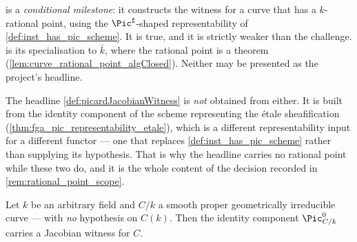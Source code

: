 \begin{remark}
  \label{rem:pointed_witness_scope}
   is a \emph{conditional
  milestone}: it constructs the witness for a curve that has a \(k\)-rational point,
  using the \(\Pic^\sharp\)-shaped representability of
  \cref{def:inst_has_pic_scheme}. It is true, and it is strictly weaker than the
  challenge.  is its specialisation to
  \(\bar k\), where the rational point is a theorem
  (\cref{lem:curve_rational_point_algClosed}). Neither may be presented as the
  project's headline.

  The headline \cref{def:picardJacobianWitness} is \emph{not} obtained from either.
  It is built from the identity component of the scheme representing the \'etale
  sheafification (\cref{thm:fga_pic_representability_etale}), which is a different
  representability input for a different functor --- one that replaces
  \cref{def:inst_has_pic_scheme} rather than supplying its hypothesis. That is why the
  headline carries no rational point while these two do, and it is the whole content
  of the decision recorded in \cref{rem:rational_point_scope}.
\end{remark}

\begin{theorem}
  \label{def:picardJacobianWitness}
  Let \(k\) be an arbitrary field and \(C/k\) a smooth proper geometrically
  irreducible curve --- with \emph{no} hypothesis on \(C(k)\). Then the identity
  component \(\Pic^0_{C/k}\) carries a Jacobian witness for \(C\).
\end{theorem}


